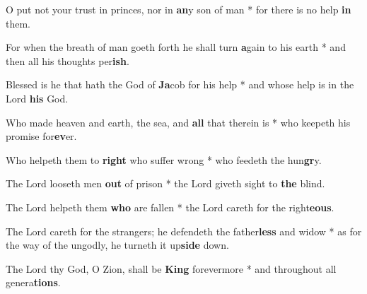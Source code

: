 \begin{multicols}{2}
	O put not your trust in princes, nor in \textbf{an}y son of man * for there is no help \textbf{in} them.
	
	For when the breath of man goeth forth he shall turn \textbf{a}gain to his earth * and then all his thoughts per\textbf{ish}.
	
	Blessed is he that hath the God of \textbf{Ja}cob for his help * and whose help is in the Lord \textbf{his} God.
	
	Who made heaven and earth, the sea, and \textbf{all} that therein is * who keepeth his promise for\textbf{ev}er.
	
	Who helpeth them to \textbf{right} who suffer wrong * who feedeth the hun\textbf{gr}y.
	
	The Lord looseth men \textbf{out} of prison * the Lord giveth sight to \textbf{the} blind.
	
	The Lord helpeth them \textbf{who} are fallen * the Lord careth for the right\textbf{eous}.
	
	The Lord careth for the strangers; he defendeth the father\textbf{less} and widow * as for the way of the ungodly, he turneth it up\textbf{side} down.
	
	The Lord thy God, O Zion, shall be \textbf{King} forevermore * and throughout all genera\textbf{tions}.
\end{multicols}